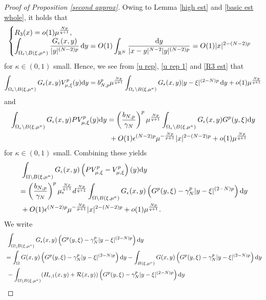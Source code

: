 \documentclass[reqno]{amsart}
\theoremstyle{remark}
\newcommand{\ep}{\epsilon}
\newcommand{\ga}{\gamma}
\newcommand{\R}{\mathbb{R}}
\newcommand{\mcr}{\mathcal{R}}
\newcommand{\dy}{\textup{d}y}
\newcommand{\mx}{{\mu,\xi}}
\renewcommand{\(}{\left(}
\renewcommand{\)}{\right)}
\numberwithin{equation}{section}
\begin{document}
\begin{proof}[Proof of Proposition \ref{second approx}]
Owing to Lemma \ref{high est} and \eqref{basic est whole}, it holds that
\begin{equation}\label{R3 est}
\begin{cases}
\displaystyle R_3(x)= o(1)\mu^{\frac{Np}{q+1}},\\
\displaystyle \int_{\Omega_\ep\setminus B(\xi,\mu^\kappa)} \frac{G_\ep(x,y)}{|y|^{(N-2)p}}\, \dy = O(1) \int_{\R^N} \frac{\dy}{|x-y|^{N-2}|y|^{(N-2)p}} = O(1)|x|^{2-(N-2)p}
\end{cases}
\end{equation}
for $\kappa \in (0,1)$ small. Hence, we see from \eqref{u rep}, \eqref{u rep 1} and \eqref{R3 est} that
$$
\int_{\Omega_\ep\setminus B(\xi,\mu^\kappa)} G_\ep(x,y) V_\mx^p(y)\dy = b_{N,p}^p\mu^{\frac{Np}{q+1}} \int_{\Omega_\ep\setminus B(\xi,\mu^\kappa)} G_\ep(x,y) |y-\xi|^{(2-N)p}\, \dy +o(1)\mu^{\frac{Np}{q+1}}
$$
and
\begin{align*}
\int_{\Omega_\ep\setminus B(\xi,\mu^\kappa)} G_\ep(x,y) PV_\mx^p(y)\dy
&=\(\frac{b_{N,p}}{\ga_N}\)^p\mu^{\frac{Np}{q+1}}\int_{\Omega_\ep\setminus B(\xi,\mu^\kappa)} G_\ep (x,y)G^p(y,\xi)\dy\\
&\ + O(1) \ep^{(N-2)p}\mu^{-\frac{Np}{p+1}}|x|^{2-(N-2)p} + o(1)\mu^{\frac{Np}{q+1}}
\end{align*}
for $\kappa \in (0,1)$ small. Combining these yields
\begin{equation}\label{ot est}
\begin{aligned}
&\ \int_{\Omega\setminus B(\xi,\mu^\kappa)} G_\ep(x,y)\(PV_\mx^p-V_\mx^p\)(y)\dy\\
&= \(\frac{b_{N,p}}{\ga_N}\)^p\mu_\ep^{\frac{Np}{q+1}}d^{\frac{Np}{q+1}} \int_{\Omega\setminus B(\xi,\mu^\kappa)} G_\ep(x,y)\(G^p(y,\xi)-\ga_N^p|y-\xi|^{(2-N)p}\)\dy\\
&\ +O(1) \ep^{(N-2)p}\mu^{-\frac{Np}{p+1}}|x|^{2-(N-2)p} + o(1)\mu^{\frac{Np}{q+1}}.
\end{aligned}
\end{equation}
We write
\begin{equation}\label{g ep to g}
\begin{aligned}
&\ \int_{\Omega\setminus B(\xi,\mu^\kappa)} G_\ep(x,y)\(G^p(y,\xi)-\ga_N^p|y-\xi|^{(2-N)p}\)\dy \\
&= \int_{\Omega} G(x,y) \(G^p(y,\xi)-\ga_N^p|y-\xi|^{(2-N)p}\)\dy - \int_{B(\xi,\mu^\kappa)} G(x,y) \(G^p(y,\xi)-\ga_N^p|y-\xi|^{(2-N)p}\)\dy \\
&\ - \int_{\Omega\setminus B(\xi,\mu^\kappa)}(H_{\ep,1}(x,y)+\mcr(x,y)) \(G^p(y,\xi)-\ga_N^p|y-\xi|^{(2-N)p}\)\dy
\end{aligned}

\end{equation}
\end{proof}
\end{document}
